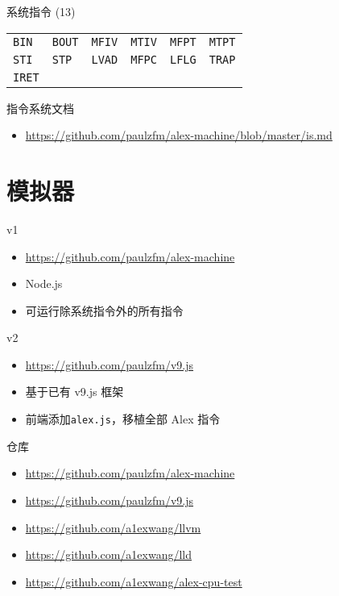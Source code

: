 \documentclass{beamer}
\renewcommand{\t}{\texttt}
\begin{document}
\begin{frame}{系统指令 (13)}
    \begin{center}
    \begin{tabular}{llllll}
        \t{BIN} & \t{BOUT} & \t{MFIV} & \t{MTIV} & \t{MFPT} & \t{MTPT} \\
        \t{STI} & \t{STP} & \t{LVAD} & \t{MFPC} & \t{LFLG} & \t{TRAP} \\
        \t{IRET} & & & & & \\
    \end{tabular}
    \end{center}
\end{frame}

\begin{frame}{指令系统文档}
    \begin{itemize}
        \item \url{https://github.com/paulzfm/alex-machine/blob/master/is.md}
    \end{itemize}
\end{frame}

\section{模拟器}

\begin{frame}{v1}
    \begin{itemize}
        \item \url{https://github.com/paulzfm/alex-machine}
        \item Node.js
        \item 可运行除系统指令外的所有指令
    \end{itemize}
\end{frame}

\begin{frame}{v2}
    \begin{itemize}
        \item \url{https://github.com/paulzfm/v9.js}
        \item 基于已有 v9.js 框架
        \item 前端添加\t{alex.js}，移植全部 Alex 指令
    \end{itemize}
\end{frame}

\begin{frame}{仓库}
    \begin{itemize}
        \item \url{https://github.com/paulzfm/alex-machine}
        \item \url{https://github.com/paulzfm/v9.js}
        \item \url{https://github.com/a1exwang/llvm}
        \item \url{https://github.com/a1exwang/lld}
        \item \url{https://github.com/a1exwang/alex-cpu-test}
    \end{itemize}
\end{frame}
\end{document}

